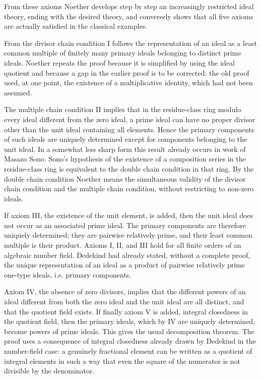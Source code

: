 \documentclass[12pt]{article}
\begin{document}
From these axioms Noether develops step by step an increasingly restricted ideal theory, ending with the desired theory, and conversely shows that all five axioms are actually satisfied in the classical examples.

From the divisor chain condition I follows the representation of an ideal as a least common multiple of finitely many primary ideals belonging to distinct prime ideals. Noether repeats the proof because it is simplified by using the ideal quotient and because a gap in the earlier proof is to be corrected: the old proof used, at one point, the existence of a multiplicative identity, which had not been assumed.

The multiple chain condition II implies that in the residue-class ring modulo every ideal different from the zero ideal, a prime ideal can have no proper divisor other than the unit ideal containing all elements. Hence the primary components of such ideals are uniquely determined except for components belonging to the unit ideal. In a somewhat less sharp form this result already occurs in work of Masazo Sono. Sono's hypothesis of the existence of a composition series in the residue-class ring is equivalent to the double chain condition in that ring. By the double chain condition Noether means the simultaneous validity of the divisor chain condition and the multiple chain condition, without restricting to non-zero ideals.

If axiom III, the existence of the unit element, is added, then the unit ideal does not occur as an associated prime ideal. The primary components are therefore uniquely determined; they are pairwise relatively prime, and their least common multiple is their product. Axioms I, II, and III hold for all finite orders of an algebraic number field. Dedekind had already stated, without a complete proof, the unique representation of an ideal as a product of pairwise relatively prime one-type ideals, i.e. primary components.

Axiom IV, the absence of zero divisors, implies that the different powers of an ideal different from both the zero ideal and the unit ideal are all distinct, and that the quotient field exists. If finally axiom V is added, integral closedness in the quotient field, then the primary ideals, which by IV are uniquely determined, become powers of prime ideals. This gives the usual decomposition theorem. The proof uses a consequence of integral closedness already drawn by Dedekind in the number-field case: a genuinely fractional element can be written as a quotient of integral elements in such a way that even the square of the numerator is not divisible by the denominator.
\end{document}
